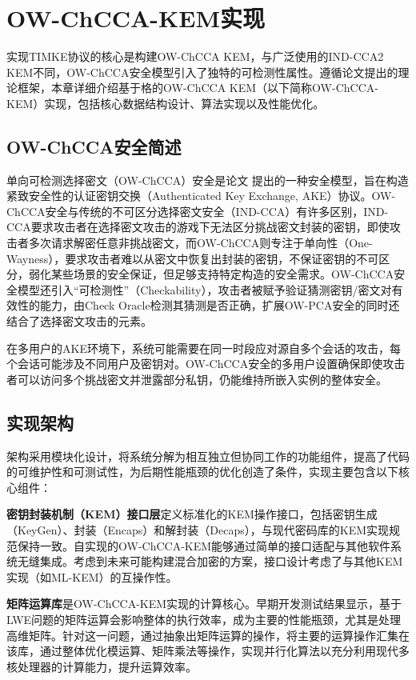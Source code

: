 \section{OW-ChCCA-KEM实现}
\label{chap:owchccakem}

实现TIMKE协议的核心是构建OW-ChCCA KEM，与广泛使用的IND-CCA2 KEM不同，OW-ChCCA安全模型引入了独特的可检测性属性。遵循论文\cite{pan_lattice-based_2023}提出的理论框架，本章详细介绍基于格的OW-ChCCA KEM（以下简称OW-ChCCA-KEM）实现，包括核心数据结构设计、算法实现以及性能优化。

\subsection{OW-ChCCA安全简述}

单向可检测选择密文（OW-ChCCA）安全是论文 \cite{pan_lattice-based_2023} 提出的一种安全模型，旨在构造紧致安全性的认证密钥交换（Authenticated Key Exchange, AKE）协议。OW-ChCCA安全与传统的不可区分选择密文安全（IND-CCA）有许多区别，IND-CCA要求攻击者在选择密文攻击的游戏下无法区分挑战密文封装的密钥，即使攻击者多次请求解密任意非挑战密文，而OW-ChCCA则专注于单向性（One-Wayness），要求攻击者难以从密文中恢复出封装的密钥，不保证密钥的不可区分，弱化某些场景的安全保证，但足够支持特定构造的安全需求。OW-ChCCA安全模型还引入“可检测性”（Checkability），攻击者被赋予验证猜测密钥/密文对有效性的能力，由Check Oracle检测其猜测是否正确，扩展OW-PCA安全的同时还结合了选择密文攻击的元素。

在多用户的AKE环境下，系统可能需要在同一时段应对源自多个会话的攻击，每个会话可能涉及不同用户及密钥对。OW-ChCCA安全的多用户设置确保即使攻击者可以访问多个挑战密文并泄露部分私钥，仍能维持所嵌入实例的整体安全。

\subsection{实现架构}

架构采用模块化设计，将系统分解为相互独立但协同工作的功能组件，提高了代码的可维护性和可测试性，为后期性能瓶颈的优化创造了条件，实现主要包含以下核心组件：

\textbf{密钥封装机制（KEM）接口层}定义标准化的KEM操作接口，包括密钥生成（KeyGen）、封装（Encaps）和解封装（Decaps），与现代密码库的KEM实现规范保持一致。自实现的OW-ChCCA-KEM能够通过简单的接口适配与其他软件系统无缝集成。考虑到未来可能构建混合加密的方案，接口设计考虑了与其他KEM实现（如ML-KEM）的互操作性。

\textbf{矩阵运算库}是OW-ChCCA-KEM实现的计算核心。早期开发测试结果显示，基于LWE问题的矩阵运算会影响整体的执行效率，成为主要的性能瓶颈，尤其是处理高维矩阵。针对这一问题，通过抽象出矩阵运算的操作，将主要的运算操作汇集在该库，通过整体优化模运算、矩阵乘法等操作，实现并行化算法以充分利用现代多核处理器的计算能力，提升运算效率。

